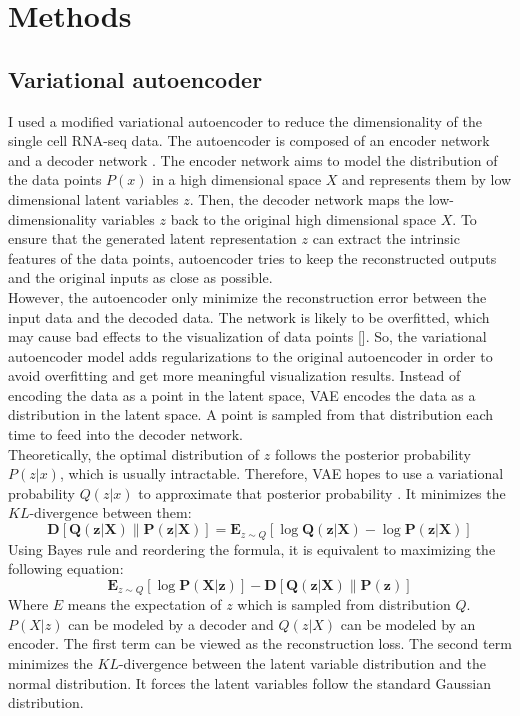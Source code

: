 \section{Methods}
\subsection{Variational autoencoder}
I used a modified variational autoencoder \cite{Kingma2014} to reduce the dimensionality of the single cell RNA-seq data. The autoencoder is composed of an encoder network and a decoder network \cite{wang2016auto}. The encoder network aims to model the distribution of the data points $P(x)$ in a high dimensional space $X$ and represents them by low dimensional latent variables $z$. Then, the decoder network maps the low-dimensionality variables $z$ back to the original high dimensional space $X$. To ensure that the generated latent representation $z$ can extract the intrinsic features of the data points, autoencoder tries to keep the reconstructed outputs and the original inputs as close as possible. \\
However, the autoencoder only minimize the reconstruction error between the input data and the decoded data. The network is likely to be overfitted, which may cause bad effects to the visualization of data points []. So, the variational autoencoder model adds regularizations to the original autoencoder in order to avoid overfitting and get more meaningful visualization results. Instead of encoding the data as a point in the latent space, VAE encodes the data as a distribution in the latent space. A point is sampled from that distribution each time to feed into the decoder network. \\
Theoretically, the optimal distribution of $z$ follows the posterior probability $P(z|x)$, which is usually intractable. Therefore, VAE hopes to use a variational probability $Q(z|x)$ to approximate that posterior probability \cite{doersch2016tutorial}. It minimizes the $KL$-divergence between them:
\begin{equation}
\boldsymbol{D}[\boldsymbol{Q}(\boldsymbol{z} | \boldsymbol{X}) \| \boldsymbol{P}(\boldsymbol{z} | \boldsymbol{X})]=\mathbf{E}_{z \sim Q}[\log \boldsymbol{Q}(\boldsymbol{z} | \boldsymbol{X})-\log \boldsymbol{P}(\boldsymbol{z} | \boldsymbol{X})]
\end{equation}
Using Bayes rule and reordering the formula, it is equivalent to maximizing the following equation:
\begin{equation}
\mathbf{E}_{z \sim Q}[\log \boldsymbol{P}(\boldsymbol{X} | \boldsymbol{z})]-\boldsymbol{D}[\boldsymbol{Q}(\boldsymbol{z} | \boldsymbol{X}) \| \boldsymbol{P}(\boldsymbol{z})]
\end{equation}
Where $E$ means the expectation of $z$ which is sampled from distribution $Q$. $P(X|z)$ can be modeled by a decoder and $Q(z|X)$ can be modeled by an encoder. The first term can be viewed as the reconstruction loss. The second term minimizes the $KL$-divergence between the latent variable distribution and the normal distribution. It forces the latent variables follow the standard Gaussian distribution.
